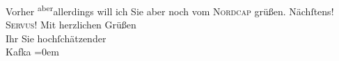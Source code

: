 \begin{ledgroupsized}[t]{13cm}
               Vorher \substVorne{}\textsuperscript{aber}\substDazwischen{}allerdings\substHinten{} will ich Sie \introOben{}aber\introOben{} noch vom \textsc{Nordcap} grüßen. Nächſtens!\pend
           \pstart
           \textsc{Servus}! Mit herzlichen Grüßen{\\[\baselineskip]}Ihr Sie hochſchätzender{\\[\baselineskip]}\spacefill\mbox{Kafka}\pend
           \leftskip=0em{}          \endnumbering{}\end{ledgroupsized}  \newcommand{\dateiname}{L00162}\newcommand{\titel}{Eduard Michael Kafka an Arthur Schnitzler, 24. 1. 1893}\newcommand{\editorInnen}{Martin Anton Müller und Gerd-Hermann Susen}
            \footnotesize
\begin{ledgroupsized}[t]{11.5cm}
\end{ledgroupsized}
         
      